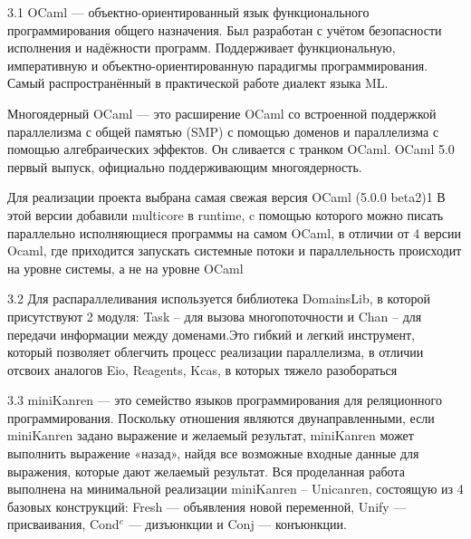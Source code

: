 3.1 OCaml — объектно-ориентированный язык
функционального программирования общего назначения.
Был разработан с учётом безопасности исполнения и надёжности 
программ. Поддерживает функциональную, императивную
и объектно-ориентированную парадигмы программирования. 
Самый распространённый в практической работе диалект языка ML. 

Многоядерный OCaml — это расширение OCaml со
встроенной поддержкой параллелизма с
общей памятью (SMP) с помощью доменов и
параллелизма с помощью алгебраических эффектов. 
Он сливается с транком OCaml. OCaml 5.0 первый 
выпуск, официально поддерживающим многоядерность.

Для реализации проекта выбрана самая свежая версия OCaml (5.0.0 beta2)1
В этой версии добавили multicore в runtime, c помощью которого можно
писать параллельно исполняющиеся программы на самом OCaml, в отличии от 4 версии
Ocaml, где приходится запускать системные потоки и параллельность происходит на уровне системы, 
а не на уровне OCaml

3.2 Для распараллеливания используется библиотека DomainsLib, в
которой присутствуют 2 модуля: Task – для вызова
многопоточности и Chan – для передачи информации между
доменами.Это гибкий и легкий инструмент, который позволяет 
облегчить процесс реализации параллелизма, в отличии отсвоих 
аналогов Eio, Reagents, Kcas, в которых тяжело разобораться

3.3 miniKanren — это семейство 
языков программирования для реляционного программирования. 
Поскольку отношения являются двунаправленными, если miniKanren 
задано выражение и желаемый результат, miniKanren может выполнить 
выражение «назад», найдя все возможные входные данные для 
выражения, которые дают желаемый результат.
Вся проделанная работа выполнена на минимальной реализации
miniKanren – Unicanren, состоящую из 4 базовых конструкций:
Fresh --- объявления новой переменной, Unify --- присваивания, Cond$^e$ --- дизъюнкции и Conj --- конъюнкции.
